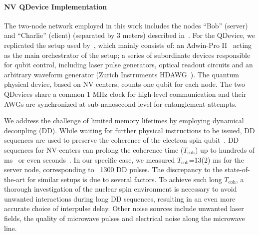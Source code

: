 \paragraph{NV QDevice Implementation}

The two-node network employed in this work includes the nodes “Bob” (server) and “Charlie” (client) (separated by 3 meters) described in~\cite{pompili_2021_multinode,hermans2022qubit,pompili_2022_experimental}.
For the QDevice, we replicated the setup used by~\cite{pompili_2022_experimental}, which mainly consists of: an Adwin-Pro II~\cite{adwin} acting as the main orchestrator of the setup; a series of subordinate devices responsible for qubit control, including laser pulse generators, optical readout circuits and an arbitrary waveform generator (Zurich Instruments HDAWG~\cite{zurich_instruments_hdawg_2019}).
The quantum physical device, based on NV centers, counts one qubit for each node.
The two QDevices share a common 1 MHz clock for high-level communication and their AWGs are synchronized at sub-nanosecond level for entanglement attempts.

We address the challenge of limited memory lifetimes by employing dynamical decoupling (DD).
While waiting for further physical instructions to be issued, DD sequences are used to preserve the coherence of the electron spin qubit~\cite{de_lange_universal_2010}.
DD sequences for NV-centers can prolong the coherence time ($T_{\text{coh}}$) up to hundreds of ms~\cite{hermans2022qubit} or even seconds~\cite{abobeih_2018_one_sec}.
In our specific case, we measured $T_{\text{coh}}$=13(2) ms for the server node, corresponding to ~1300 DD pulses.
The discrepancy to the state-of-the-art for similar setups is due to several factors.
To achieve such long $T_{\text{coh}}$, a thorough investigation of the nuclear spin environment is necessary to avoid unwanted interactions during long DD sequences, resulting in an even more accurate choice of interpulse delay.
Other noise sources include unwanted laser fields, the quality of microwave pulses and electrical noise along the microwave line.  

